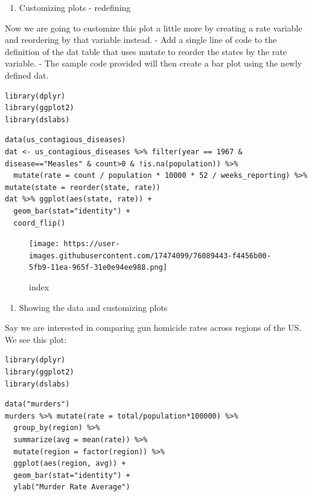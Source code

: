 \documentclass[
]{article}
\providecommand{\tightlist}{%
  \setlength{\itemsep}{0pt}\setlength{\parskip}{0pt}}
\begin{document}
\begin{enumerate}
\def\labelenumi{\arabic{enumi}.}
\setcounter{enumi}{1}
\tightlist
\item
  Customizing plots - redefining
\end{enumerate}

Now we are going to customize this plot a little more by creating a rate
variable and reordering by that variable instead. - Add a single line of
code to the definition of the dat table that uses mutate to reorder the
states by the rate variable. - The sample code provided will then create
a bar plot using the newly defined dat.

\begin{verbatim}
library(dplyr)
library(ggplot2)
library(dslabs)
\end{verbatim}

\begin{verbatim}
data(us_contagious_diseases)
dat <- us_contagious_diseases %>% filter(year == 1967 & disease=="Measles" & count>0 & !is.na(population)) %>%
  mutate(rate = count / population * 10000 * 52 / weeks_reporting) %>% mutate(state = reorder(state, rate))
dat %>% ggplot(aes(state, rate)) +
  geom_bar(stat="identity") +
  coord_flip()
\end{verbatim}

\begin{figure}
\centering
\texttt{[image: https://user-images.githubusercontent.com/17474099/76089443-f4456b00-5fb9-11ea-965f-31e0e94ee988.png]}
\caption{index}
\end{figure}

\begin{enumerate}
\def\labelenumi{\arabic{enumi}.}
\setcounter{enumi}{2}
\tightlist
\item
  Showing the data and customizing plots
\end{enumerate}

Say we are interested in comparing gun homicide rates across regions of
the US. We see this plot:

\begin{verbatim}
library(dplyr)
library(ggplot2)
library(dslabs)
\end{verbatim}

\begin{verbatim}
data("murders")
murders %>% mutate(rate = total/population*100000) %>%
  group_by(region) %>%
  summarize(avg = mean(rate)) %>%
  mutate(region = factor(region)) %>%
  ggplot(aes(region, avg)) +
  geom_bar(stat="identity") +
  ylab("Murder Rate Average")
\end{verbatim}
\end{document}
